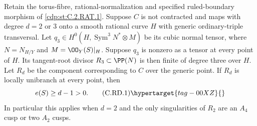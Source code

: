 \begin{proposition}\hypertarget{tag-01CH}{}\label{cdp:st:C.2.RAT.5}


Retain the torus-fibre, rational-normalization and specified
ruled-boundary morphism of \ref{cdp:st:C.2.RAT.1}. Suppose $C$ is not
contracted and maps with degree $d=2$ or $3$ onto a smooth
rational curve $H$ with generic ordinary-triple transversal.
Let $q_3\in H^0(H,\operatorname{Sym}^3N^*\otimes M)$ be
its cubic normal tensor, where $N=N_{H/Y}$ and
$M=\OO_Y(S)|_H$. Suppose $q_3$ is nonzero as a tensor at
every point of $H$. Its tangent-root divisor
$R_3\subset\PP(N)$ is then finite of degree three over $H$.
Let $R_d$ be the component corresponding to $C$ over the
generic point. If $R_d$ is locally unibranch at every point,
then
\[
                           e(S)\ge d-1>0.
\tag{C.RD.1}\hypertarget{tag-00XZ}{}\label{cdp:eq:C.RD.1}
\]
In particular this applies when $d=2$ and the only singularities
of $R_2$ are an $A_4$ cusp or two $A_2$ cusps.
\end{proposition}

